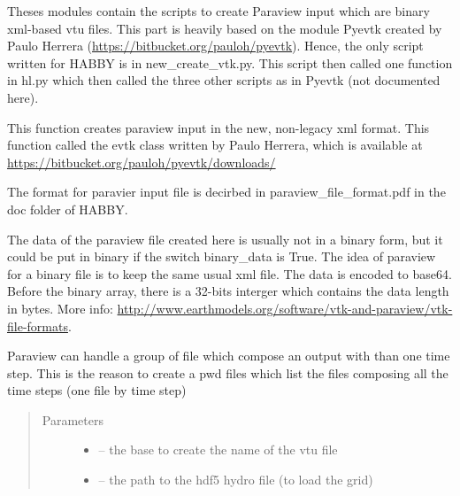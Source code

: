\documentclass[letterpaper,10pt,english]{sphinxmanual}
\begin{document}
Theses modules contain the scripts to create Paraview input which are binary xml-based vtu files. This part is heavily based on the module
Pyevtk created by Paulo Herrera (\url{https://bitbucket.org/pauloh/pyevtk}). Hence, the only script written for HABBY is in new\_create\_vtk.py. This
script then called one function in hl.py which then called the three other scripts as in Pyevtk (not documented here).
\label{\detokenize{index:module-src.new_create_vtk}}

\begin{fulllineitems}
\label{\detokenize{index:src.new_create_vtk.habitat_to_vtu}}
This function creates paraview input in the new, non-legacy xml format. This function called the evtk class
written by Paulo Herrera, which is available at \url{https://bitbucket.org/pauloh/pyevtk/downloads/}

The format for paravier input file is decirbed in paraview\_file\_format.pdf in the doc folder of HABBY.

The data of the paraview file created here  is usually not in a binary form, but it could be put in binary if the
switch binary\_data is True. The idea of paraview for a binary file is to keep the same usual xml file. The data is
encoded to base64. Before the binary array, there is a 32-bits interger which contains the data length in bytes.
More info: \url{http://www.earthmodels.org/software/vtk-and-paraview/vtk-file-formats}.

Paraview can handle a group of file which compose an output with than one time step. This is the reason to create a
pwd files which list the files composing all the time steps (one file by time step)
\begin{quote}\begin{description}
\item[{Parameters}] \leavevmode\begin{itemize}
\item {} 
 -- the base to create the name of the vtu file

\item {} 
 -- the path to the hdf5 hydro file (to load the grid)


\end{itemize}
\end{description}
\end{quote}
\end{fulllineitems}
\end{document}

